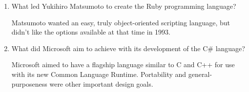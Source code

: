 \begin{enumerate}
  \item What led Yukihiro Matsumoto to create the Ruby programming language?

  \begin{answer}

    Matsumoto wanted an easy, truly object-oriented scripting language, but
    didn't like the options available at that time in 1993.

    \end{answer}

  \item What did Microsoft aim to achieve with its development of the
    C\# language?

  \begin{answer}

    Microsoft aimed to have a flagship language similar to C and C++ for use
    with its new Common Language Runtime. Portability and general-purposeness
    were other important design goals.

    \end{answer}

  \end{enumerate}
